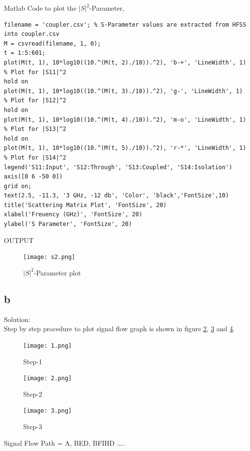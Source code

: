 \newpage
Matlab Code to plot the $|S|^2$-Parameter,
\begin{lstlisting}
filename = 'coupler.csv'; % S-Parameter values are extracted from HFSS into coupler.csv
M = csvread(filename, 1, 0);
t = 1:5:601;
plot(M(t, 1), 10*log10((10.^(M(t, 2)./10)).^2), 'b-+', 'LineWidth', 1) % Plot for |S11|^2
hold on 
plot(M(t, 1), 10*log10((10.^(M(t, 3)./10)).^2), 'g-', 'LineWidth', 1) % Plot for |S12|^2
hold on
plot(M(t, 1), 10*log10((10.^(M(t, 4)./10)).^2), 'm-o', 'LineWidth', 1) % Plot for |S13|^2
hold on 
plot(M(t, 1), 10*log10((10.^(M(t, 5)./10)).^2), 'r-*', 'LineWidth', 1) % Plot for |S14|^2
legend('S11:Input', 'S12:Through', 'S13:Coupled', 'S14:Isolation')
axis([0 6 -50 0])
grid on;
text(2.5, -11.3, '3 GHz, -12 db', 'Color', 'black','FontSize',10)
title('Scattering Matrix Plot', 'FontSize', 20)
xlabel('Freuency (GHz)', 'FontSize', 20)
ylabel('S Parameter', 'FontSize', 20)
\end{lstlisting}
OUTPUT
\begin{figure}[!ht]
	\centering
	\texttt{[image: s2.png]}
	\caption{\label{s_matrix} $|S|^2$-Parameter plot}
\end{figure}


\subsection{b}
Solution:\\
Step by step procedure to plot signal flow graph \cite{link3} is shown in figure \ref{1}, \ref{2} and \ref{3}.

\begin{figure}[!ht]
	\centering
	\texttt{[image: 1.png]}
	\caption{\label{1} Step-1}
\end{figure}

\begin{figure}[!ht]
	\centering
	\texttt{[image: 2.png]}
	\caption{\label{2} Step-2}
\end{figure}

\begin{figure}[!ht]
	\centering
	\texttt{[image: 3.png]}
	\caption{\label{3} Step-3}
\end{figure}

Signal Flow Path = A, BED, BFIHD …..



